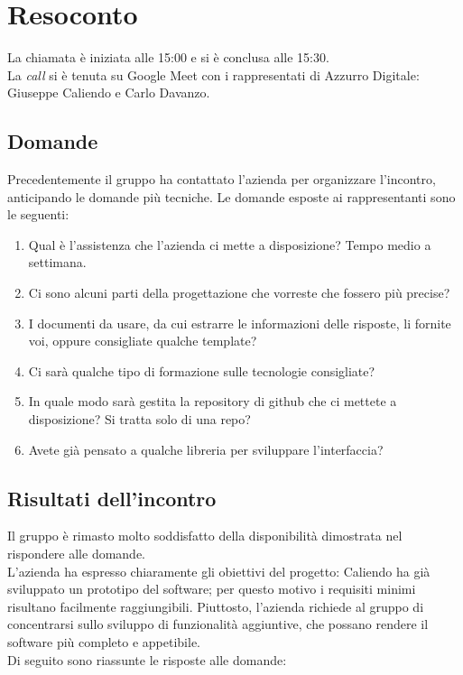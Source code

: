 \section{Resoconto}
La chiamata è iniziata alle 15:00 e si è conclusa alle 15:30. \\
La \textit{call} si è tenuta su Google Meet con i rappresentati di Azzurro
Digitale: Giuseppe Caliendo e Carlo Davanzo.
\subsection{Domande}
Precedentemente il gruppo ha contattato l'azienda per organizzare l'incontro, 
anticipando le domande più tecniche.
Le domande esposte ai rappresentanti sono le seguenti:

\begin{enumerate}
	\item Qual è l'assistenza che l'azienda ci mette a disposizione? Tempo medio a
  settimana.
	\item Ci sono alcuni parti della progettazione che vorreste che fossero più precise?
	\item I documenti da usare, da cui estrarre le informazioni delle risposte, li
	  fornite voi, oppure consigliate qualche template?
	\item Ci sarà qualche tipo di formazione sulle tecnologie consigliate?
	\item In quale modo sarà gestita la repository di github che ci mettete a 
		disposizione? Si tratta solo di una repo?
	\item Avete già pensato a qualche libreria per sviluppare l'interfaccia?
\end{enumerate}

\subsection{Risultati dell'incontro}
Il gruppo è rimasto molto soddisfatto della disponibilità dimostrata nel 
rispondere alle domande. \\ 
L'azienda ha espresso chiaramente gli obiettivi del progetto: Caliendo ha già
sviluppato un prototipo del software; per questo motivo i requisiti minimi
risultano facilmente raggiungibili. Piuttosto, l'azienda richiede al gruppo di
concentrarsi sullo sviluppo di funzionalità aggiuntive, che possano rendere il
software più completo e appetibile. \\
Di seguito sono riassunte le risposte alle domande:

